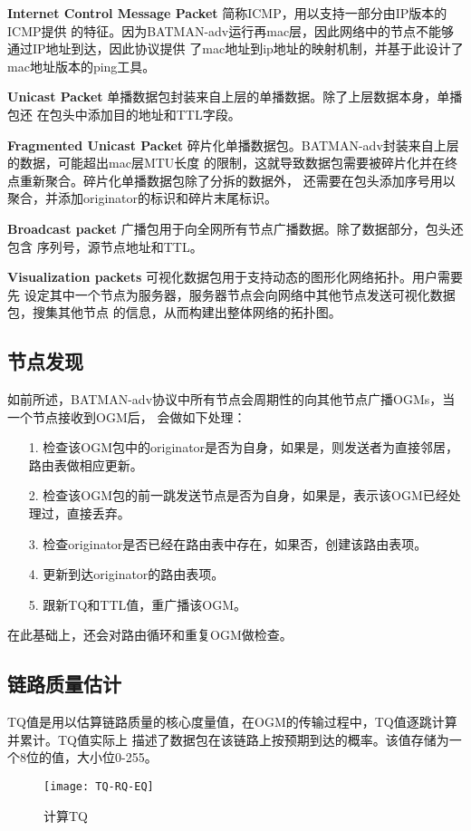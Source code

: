 \textbf{Internet Control Message Packet} 简称ICMP，用以支持一部分由IP版本的ICMP提供
的特征。因为BATMAN-adv运行再mac层，因此网络中的节点不能够通过IP地址到达，因此协议提供
了mac地址到ip地址的映射机制，并基于此设计了mac地址版本的ping工具。

\textbf{Unicast Packet} 单播数据包封装来自上层的单播数据。除了上层数据本身，单播包还
在包头中添加目的地址和TTL字段。

\textbf{Fragmented Unicast Packet} 碎片化单播数据包。BATMAN-adv封装来自上层的数据，可能超出mac层MTU长度
的限制，这就导致数据包需要被碎片化并在终点重新聚合。碎片化单播数据包除了分拆的数据外，
还需要在包头添加序号用以聚合，并添加originator的标识和碎片末尾标识。

\textbf{Broadcast packet} 广播包用于向全网所有节点广播数据。除了数据部分，包头还包含
序列号，源节点地址和TTL。

\textbf{Visualization packets} 可视化数据包用于支持动态的图形化网络拓扑。用户需要先
设定其中一个节点为服务器，服务器节点会向网络中其他节点发送可视化数据包，搜集其他节点
的信息，从而构建出整体网络的拓扑图。

\subsection{节点发现}
如前所述，BATMAN-adv协议中所有节点会周期性的向其他节点广播OGMs，当一个节点接收到OGM后，
会做如下处理：
\begin{itemize}
\item[1.] 检查该OGM包中的originator是否为自身，如果是，则发送者为直接邻居，路由表做相应更新。
\item[2.] 检查该OGM包的前一跳发送节点是否为自身，如果是，表示该OGM已经处理过，直接丢弃。
\item[3.] 检查originator是否已经在路由表中存在，如果否，创建该路由表项。
\item[4.] 更新到达originator的路由表项。
\item[5.] 跟新TQ和TTL值，重广播该OGM。
\end{itemize}
在此基础上，还会对路由循环和重复OGM做检查。

\subsection{链路质量估计}
TQ值是用以估算链路质量的核心度量值，在OGM的传输过程中，TQ值逐跳计算并累计。TQ值实际上
描述了数据包在该链路上按预期到达的概率。该值存储为一个8位的值，大小位0-255。

\begin{figure}[H] %
  \centering
  \texttt{[image: TQ-RQ-EQ]}
  \caption{计算TQ}
  \label{fig:TQ-RQ-EQ}
\end{figure}

